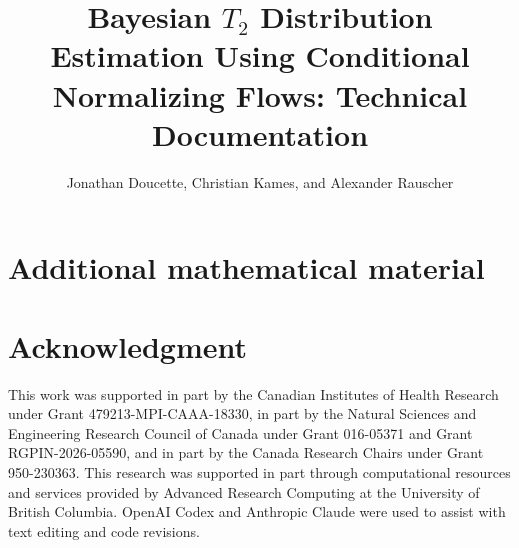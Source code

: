 \documentclass[11pt]{article}
\title{Bayesian $T_2$ Distribution Estimation Using Conditional Normalizing Flows: Technical Documentation}
\author{Jonathan Doucette, Christian Kames, and Alexander Rauscher}
\date{}
\begin{document}
\maketitle
\tableofcontents


\clearpage

\appendix

\clearpage

\section*{Additional mathematical material}


\section*{Acknowledgment}

This work was supported in part by the Canadian Institutes of Health Research under Grant 479213-MPI-CAAA-18330, in part by the Natural Sciences and Engineering Research Council of Canada under Grant 016-05371 and Grant RGPIN-2026-05590, and in part by the Canada Research Chairs under Grant 950-230363.
This research was supported in part through computational resources and services provided by Advanced Research Computing at the University of British Columbia.
OpenAI Codex and Anthropic Claude were used to assist with text editing and code revisions.



\end{document}
